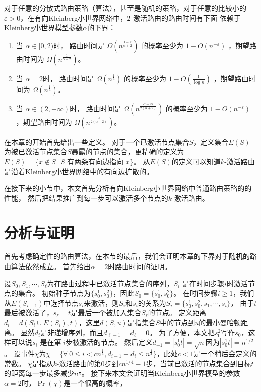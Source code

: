 \begin{theorem}\label{thm:routing}
对于任意的分散式路由策略（算法），甚至是随机的策略，对于任意的比较小的$\varepsilon > 0$，在有向Kleinberg小世界网络中，$2$-激活路由的路由时间有下面
依赖于Kleinberg小世界模型参数$\alpha$的下界：


\begin{enumerate}
\item
当 $\alpha\in [0,2)$时， 路由时间是 $\Omega( n^{\frac{1-\varepsilon}{\alpha + 2}})$ 的概率至少为 $1-O(n^{-\varepsilon})$ 
，期望路由时间为 $\Omega( n^{\frac{1}{\alpha + 2}})$。
\item
当 $\alpha = 2$时， 路由时间是 $\Omega(n^{\frac{1}{4}})$ 的概率至少为 $1-O(\frac{1}{\log n})$ 
，期望路由时间为 $\Omega(n^{\frac{1}{4}})$。
\item
当 $\alpha\in (2,+\infty)$时， 路由时间是 $\Omega( n^{\frac{\alpha-2\varepsilon}{2(\alpha+2)}})$ 的概率至少为 $1-O(n^{-\varepsilon})$ 
，期望路由时间为 $\Omega( n^{\frac{\alpha}{2(\alpha+2)}})$。

\end{enumerate}
\end{theorem}


在本章的开始首先给出一些定义。
对于一个已激活节点集合$S$，定义集合$E(S)$为被已激活节点集合$S$暴露的节点的集合，更精确的定义为
$E(S) = \{x\notin S\ |\ S \mbox{ 有两条有向边指向 } x\}$。
从$E(S)$的定义可以知道$k$-激活路由是沿着Kleinberg小世界网络中的有向边扩散的。

在接下来的小节中，本文首先分析有向Kleinberg小世界网络中普通路由策略的的性能，
然后把结果推广到每一步可以激活多个节点的$k$-激活路由。



\section{分析与证明}
首先考虑确定性的路由算法，在本节的最后，我们会证明本章的下界对于随机的路由算法依然成立。
首先给出$\alpha = 2$时路由时间的证明。

设$S_0, S_1,\cdots, S_{\ell}$为在路由过程中已激活节点集合的序列，$S_i$ 是在时间步骤$i$时激活节点的集合。
初始种子节点为$\{s_0^1,s_0^2\}$，因此$S_0 = \{s_0^1,s_0^2\}$。
在时间步骤$i \geq 1$，我们从$E(S_{i-1})$中选择节点$s_{i}$来激活，则$S_i$和$s_i$的关系为$S_i = \{s_0^1,s_0^2,s_1,\cdots,s_{i}\}$，
由于$t$最后被激活了，$s_{\ell}=t$是最后一个被加入集合$S_{\ell}$的节点。
定义距离$d_i = d(S_i \cup E(S_i),t)$，这里$d(S,u)$是指集合$S$中的节点到$u$的最小曼哈顿距离。
显然$d_i$是非递增序列，而且$d_{\ell-1} = d_{\ell}= 0$。
为了方便，本文把$s_0^2$写作$s_0$，这样可以说$s_i$ 是在第 $i$步被激活的节点。
然后定义$d_{-1} = |s_0^1t| = \sqrt{n}$因为$|s_0^1t| = n^{1/2}$。
设事件$\chi$为$\chi = \{\forall~0 \leq i < cn^{\frac{1}{4}}, d_{i-1}-d_{i}\leq n^{\frac{1}{4}}\}$，此处$c<1$是一个稍后会定义的常数。
$\chi$是指从$k$-激活路由的第$0$步到$cn^{1/4}-1$步，当前已激活的节点集合到目标$t$的距离每一步最多减少$n^{\frac{1}{4}}$。
接下来本文会证明当Kleinberg小世界模型的参数$\alpha = 2$时，$\Pr(\chi)$是一个很高的概率，



